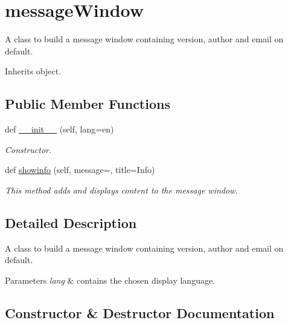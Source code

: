 \hypertarget{classbackpack_1_1src_1_1gui_1_1window_1_1messageWindow}{}\section{message\+Window}
\label{classbackpack_1_1src_1_1gui_1_1window_1_1messageWindow}


A class to build a message window containing version, author and email on default.  




Inherits object.

\subsection*{Public Member Functions}
\begin{DoxyCompactItemize}
\item 
def \mbox{\hyperlink{classbackpack_1_1src_1_1gui_1_1window_1_1messageWindow_a20b59d972f327eb73df9cc8a51e69a3c}{\+\_\+\+\_\+init\+\_\+\+\_\+}} (self, lang=\textquotesingle{}en\textquotesingle{})
\begin{DoxyCompactList}\small\item\em Constructor. \end{DoxyCompactList}\item 
def \mbox{\hyperlink{classbackpack_1_1src_1_1gui_1_1window_1_1messageWindow_ac363d9b210b00523bd2d7b73e5f1a2dd}{showinfo}} (self, message=\textquotesingle{}\textquotesingle{}, title=\textquotesingle{}Info\textquotesingle{})
\begin{DoxyCompactList}\small\item\em This method adds and displays content to the message window. \end{DoxyCompactList}\end{DoxyCompactItemize}


\subsection{Detailed Description}
A class to build a message window containing version, author and email on default. 


\begin{DoxyParams}{Parameters}
{\em lang} & contains the chosen display language. \\
\hline
\end{DoxyParams}


\subsection{Constructor \& Destructor Documentation}
\mbox{\label{classbackpack_1_1src_1_1gui_1_1window_1_1messageWindow_a20b59d972f327eb73df9cc8a51e69a3c}} 
